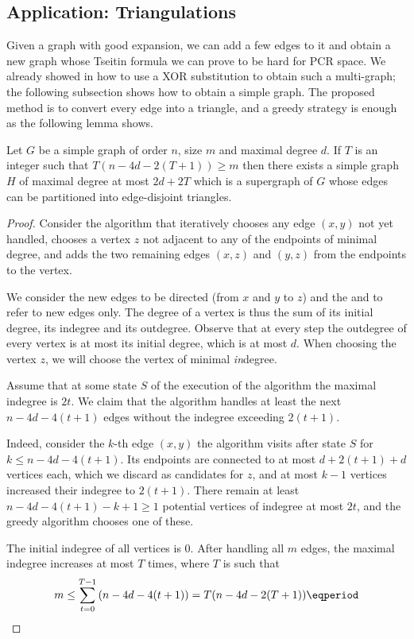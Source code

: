 \documentclass{toc}
\begin{document}
\subsection{Application: Triangulations}
\label{sec:triangulations}

Given a graph with good expansion, we can add a few edges to it and obtain a new graph whose Tseitin formula we can prove to be hard for PCR space. We already showed in  how to use a XOR substitution to obtain such a multi-graph; the following subsection shows how to obtain a simple graph. The proposed method is to convert every edge into a triangle, and a greedy strategy is enough as the following lemma shows.

\begin{lemma}
\label{lem:triangulation}
  Let $G$ be a simple graph of order $n$, size $m$ and maximal degree $d$. If $T$ is an integer such that $T(n-4d-2(T+1))\geq m$ then there exists a simple graph $H$ of maximal degree at most $2d+2T$ which is a supergraph of $G$ whose edges can be partitioned into edge-disjoint triangles.
\end{lemma}

\begin{proof}
  Consider the algorithm that iteratively chooses any edge $(x,y)$ not yet handled, chooses a vertex $z$ not adjacent to any of the endpoints of minimal degree, and adds the two remaining edges $(x,z)$ and $(y,z)$ from the endpoints to the vertex.

We consider the new edges to be directed (from $x$ and $y$ to $z$) and the  and  to refer to new edges only. The degree of a vertex is thus the sum of its initial degree, its indegree and its outdegree. Observe that at every step the outdegree of every vertex is at most its initial degree, which is at most $d$. When choosing the vertex $z$, we will choose the vertex of minimal \emph{in}degree.

Assume that at some state $S$ of the execution of the algorithm the maximal indegree is $2t$. We claim that the algorithm handles at least the next $n-4d-4(t+1)$ edges without the indegree exceeding $2(t+1)$.

Indeed, consider the $k$-th edge $(x,y)$ the algorithm visits after state $S$ for $k \leq n-4d-4(t+1)$. Its endpoints are connected to at most $d+2(t+1)+d$ vertices each, which we discard as candidates for $z$, %
and at most $k-1$ vertices increased their indegree to $2(t+1)$.
%
There remain at least $n-4d-4(t+1)-k+1\geq 1$ potential vertices of indegree at most $2t$, and the greedy algorithm chooses one of these.

%
The initial indegree of all vertices is $0$. After handling all $m$ edges, the maximal indegree increases at most $T$ times, where $T$ is such that
\begin{equation}
  \label{eq:triangulation-bound}
  m\leq \sum_{t=0}^{T-1}\left(n-4d-4(t+1)\right) = T(n-4d-2(T+1)) \eqperiod \qedhere
\end{equation}
\end{proof}
\end{document}
